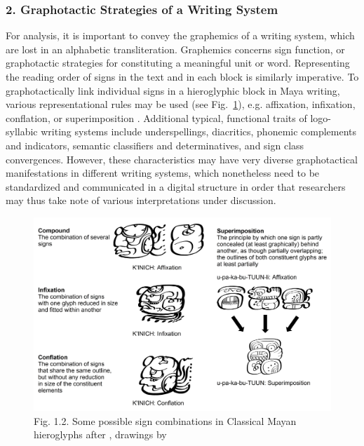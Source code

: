 \documentclass[amsthm,ebook]{saparticle}
\begin{document}
\subsubsection[2. Graphotactic Strategies of a Writing System ]{2. Graphotactic Strategies of a Writing System
}
For analysis, it is important to convey the graphemics of a writing system, which are lost in an alphabetic
transliteration. Graphemics concerns sign function, or graphotactic strategies for constituting a meaningful unit or
word. Representing the reading order of signs in the text and in each block is similarly imperative. To
graphotactically link individual signs in a hieroglyphic block in Maya writing, various representational rules may be
used (see Fig.~\ref{fig:2}), e.g. affixation, infixation, conflation, or superimposition \citep{Zender1999}. Additional typical,
functional traits of logo-syllabic writing systems include underspellings, diacritics, phonemic complements and
indicators, semantic classifiers and determinatives, and sign class convergences. However, these characteristics may
have very diverse graphotactical manifestations in different writing systems, which nonetheless need to be standardized
and communicated in a digital structure in order that researchers may thus take note of various interpretations under
discussion. 

\begin{figure}[!bp]
\centering
 \includegraphics[width=\columnwidth]{EAGLE2016submission8revisedx-img002.png}
\caption[Some possible sign combinations in Classical Mayan hieroglyphs after \citet{Zender1999}, drawings by
\citet{Prager2015}]{Fig. 1.2. Some possible sign combinations in Classical Mayan hieroglyphs after \citet{Zender1999}, drawings by \citet{Prager2015}}
\label{fig:2}
\end{figure}
\end{document}
